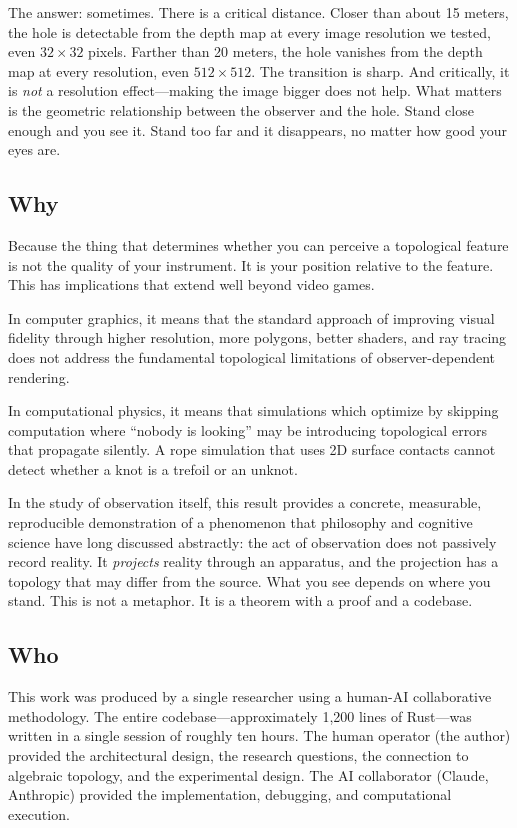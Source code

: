\documentclass[11pt,a4paper]{article}
\theoremstyle{remark}
\begin{document}
The answer: sometimes. There is a critical distance. Closer than about 15 meters, the hole is detectable from the depth map at every image resolution we tested, even $32\times32$ pixels. Farther than 20 meters, the hole vanishes from the depth map at every resolution, even $512\times512$. The transition is sharp. And critically, it is \emph{not} a resolution effect---making the image bigger does not help. What matters is the geometric relationship between the observer and the hole. Stand close enough and you see it. Stand too far and it disappears, no matter how good your eyes are.

\subsection*{Why}

Because the thing that determines whether you can perceive a topological feature is not the quality of your instrument. It is your position relative to the feature. This has implications that extend well beyond video games.

In computer graphics, it means that the standard approach of improving visual fidelity through higher resolution, more polygons, better shaders, and ray tracing does not address the fundamental topological limitations of observer-dependent rendering.

In computational physics, it means that simulations which optimize by skipping computation where ``nobody is looking'' may be introducing topological errors that propagate silently. A rope simulation that uses 2D surface contacts cannot detect whether a knot is a trefoil or an unknot.

In the study of observation itself, this result provides a concrete, measurable, reproducible demonstration of a phenomenon that philosophy and cognitive science have long discussed abstractly: the act of observation does not passively record reality. It \emph{projects} reality through an apparatus, and the projection has a topology that may differ from the source. What you see depends on where you stand. This is not a metaphor. It is a theorem with a proof and a codebase.

\subsection*{Who}

This work was produced by a single researcher using a human-AI collaborative methodology. The entire codebase---approximately 1,200 lines of Rust---was written in a single session of roughly ten hours. The human operator (the author) provided the architectural design, the research questions, the connection to algebraic topology, and the experimental design. The AI collaborator (Claude, Anthropic) provided the implementation, debugging, and computational execution.
\end{document}

